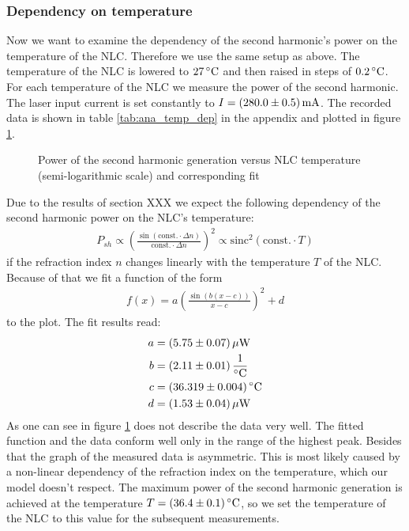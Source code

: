 \documentclass{protokoll_en}
\begin{document}
\subsubsection{Dependency on temperature}\label{subsubsec:ana_temp_dep}
Now we want to examine the dependency of the second harmonic's power on the temperature of the NLC. Therefore we use the same setup as above. The temperature of the NLC is lowered to $\unit[27]{^\circ C}$ and then raised in steps of $\unit[0.2]{^\circ C}$. For each temperature of the NLC we measure the power of the second harmonic. The laser input current is set constantly to $I=\unit[(280.0 \pm 0.5)]{mA}$. The recorded data is shown in table \ref{tab:ana_temp_dep} in the appendix and plotted in figure \ref{fig:ana_temp_dep}.
\begin{figure}[H]
  \resizebox{0.8\textwidth}{!}{
     
}
  \caption{Power of the second harmonic generation versus NLC temperature (semi-logarithmic scale) and corresponding fit}
  \label{fig:ana_temp_dep}
\end{figure}
Due to the results of section XXX we expect the following dependency of the second harmonic power on the NLC's temperature:
\begin{align}
P_{sh} \propto \left( \frac{\sin\left(\textrm{const.} \cdotp \Delta n\right)}{\textrm{const.}\cdotp \Delta n}\right)^2 \propto \textrm{sinc}^2\left(\textrm{const.}\cdotp T\right)
\end{align}
if the refraction index $n$ changes linearly with the temperature $T$ of the NLC. Because of that we fit a function of the form
\begin{align}
f(x) = a\left(\frac{\sin\left(b(x-c)\right)}{x-c}\right)^2+d
\end{align}
to the plot. The fit results read:
\begin{align}
a &= \unit[(5.75 \pm 0.07)]{\mu W}\\
\notag b &= \unit[(2.11 \pm 0.01)]{\frac{1}{^\circ C}}\\
\notag c &= \unit[(36.319 \pm 0.004)]{^\circ C}\\
\notag d &= \unit[(1.53 \pm 0.04)]{\mu W}
\end{align}
As one can see in figure \ref{fig:ana_temp_dep} does not describe the data very well. The fitted function and the data conform well only in the range of the highest peak. Besides that the graph of the measured data is asymmetric. This is most likely caused by a non-linear dependency of the refraction index on the temperature, which our model doesn't respect. The maximum power of the second harmonic generation is achieved at the temperature $T=\unit[(36.4 \pm 0.1)]{^\circ C}$, so we set the temperature of the NLC to this value for the subsequent measurements.
\end{document}
